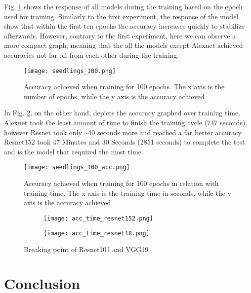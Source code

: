 Fig. \ref{fig:seedlings_100_epoch_accuracy} shows the response of all models during the training based on the epoch used for training. Similarly to the first experiment, the response of the model show that within the first ten epochs the accuracy increases quickly to stabilize afterwards. However, contrary to the first experiment, here we can observe a more compact graph, meaning that the all the models except Alexnet achieved accuracies not far off from each other during the training. 

\begin{figure}[h]
       \centering 
	    \texttt{[image: seedlings\_100.png]}
        \caption[Accuracy achieved when training for 100 epochs]{Accuracy achieved when training for 100 epochs. The x axis is the number of epochs, while the y axis is the accuracy achieved}
         \label{fig:seedlings_100_epoch_accuracy}
\end{figure}


In Fig. \ref{fig:seedlings_100_acc}, on the other hand, depicts the accuracy graphed over training time. Alexnet took the least amount of time to finish the training cycle (747 seconds), however Resnet took only \textasciitilde40 seconds more and reached a far better accuracy. Resnet152 took 47 Minutes and 30 Seconds (2851 seconds) to complete the test and is the model that required the most time. 
\begin{figure}[h]
       \centering 
	    \texttt{[image: seedlings\_100\_acc.png]}
        \caption[Accuracy achieved when training for 100 epochs in relation with training time]{Accuracy achieved when training for 100 epochs in relation with training time. The x axis is the training time in seconds, while the y axis is the accuracy achieved}
         \label{fig:seedlings_100_acc}
\end{figure}

\begin{figure}[h]
     \begin{subfigure}{0.5\textwidth}
	    \texttt{[image: acc\_time\_resnet152.png]}
        \label{fig:acc_time_resnet152}
     \end{subfigure}
     \begin{subfigure}{0.5\textwidth}
	    \texttt{[image: acc\_time\_resnet18.png]}
        \label{fig:acc_time_resnet18}
     \end{subfigure}
        \caption{Breaking point of Resnet101 and VGG19}
        \label{fig:sing_acc_time_rr}
\end{figure}


\section{Conclusion}

